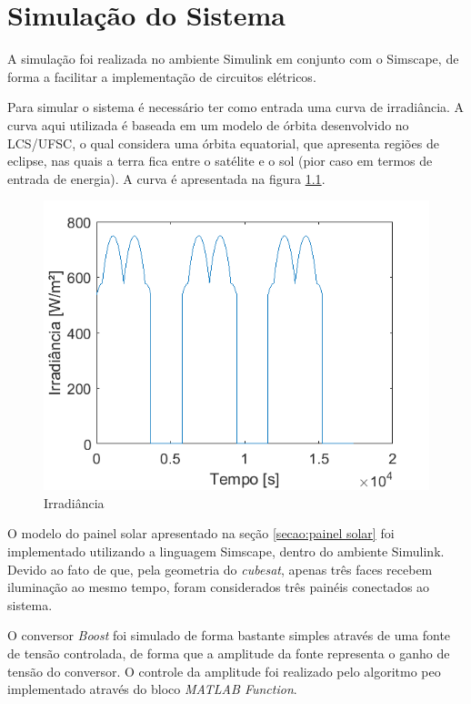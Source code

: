 \chapter{Simulação do Sistema} \label{secao:simulacao_sistema}

A simulação foi realizada no ambiente Simulink em conjunto com o Simscape, de forma a facilitar a implementação de circuitos elétricos.

Para simular o sistema é necessário ter como entrada uma curva de irradiância. A curva aqui utilizada é baseada em um modelo de órbita desenvolvido no LCS/UFSC, o qual considera uma órbita equatorial, que apresenta regiões de eclipse, nas quais a terra fica entre o satélite e o sol (pior caso em termos de entrada de energia). A curva é apresentada na figura \ref{figura_irradiancia_simulacao}.

\begin{figure}[!htpb]
\begin{center}
\includegraphics[scale=0.5]{figures/simulatedIrradiance.png}
\caption{Irradiância}
\label{figura_irradiancia_simulacao}
\end{center}
\end{figure}

O modelo do painel solar apresentado na seção \ref{secao:painel solar} foi implementado utilizando a linguagem Simscape, dentro do ambiente Simulink. Devido ao fato de que, pela geometria do \textit{cubesat}, apenas três faces recebem iluminação ao mesmo tempo, foram considerados três painéis conectados ao sistema.

O conversor \textit{Boost} foi simulado de forma bastante simples através de uma fonte de tensão controlada, de forma que a amplitude da fonte representa o ganho de tensão do conversor. O controle da amplitude foi realizado pelo algoritmo \gls{peo} implementado através do bloco \textit{MATLAB Function}.

